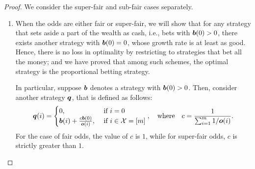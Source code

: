     \begin{proof}
        We consider the  super-fair  and sub-fair cases separately. 
        \begin{enumerate}[label=(\alph*)]
            \item When the odds are either fair or super-fair, we will show that for any strategy that sets aside a part of the wealth as cash, i.e., bets with $\boldsymbol{b}(0)>0$, there exists another strategy with $\boldsymbol{b}(0)=0$, whose growth rate is at least as good. Hence, there is no loss in optimality by restricting to strategies that bet all the money; and we have proved that among such schemes, the optimal strategy is the proportional betting strategy. 

            In particular, suppose $\boldsymbol{b}$ denotes a strategy with $\boldsymbol{b}(0)>0$. Then, consider another strategy $\boldsymbol{q}$, that is defined as follows: 
            \begin{align}
                \boldsymbol{q}(i) = \begin{cases}
                    0, & \text{ if } i = 0  \\
                    \boldsymbol{b}(i) + \frac{c \boldsymbol{b}(0)}{\boldsymbol{o}(i)}, & \text{ if } i \in \mathcal{X} = [m]
                \end{cases}, 
                \quad \text{where} \quad c = \frac{1}{\sum_{i=1}^m 1/\boldsymbol{o}(i)}. 
            \end{align}
            For the case of fair odds, the value of $c$ is $1$, while for super-fair odds, $c$ is strictly greater than $1$. 


\end{enumerate}
\end{proof}
